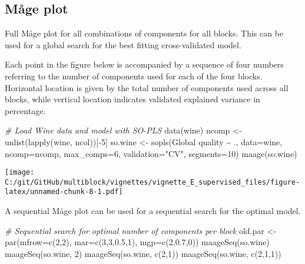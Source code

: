 \documentclass[
]{article}
\newenvironment{Shaded}{\begin{snugshade}}{\end{snugshade}}
\newcommand{\AttributeTok}[1]{\textcolor[rgb]{0.77,0.63,0.00}{#1}}
\newcommand{\CommentTok}[1]{\textcolor[rgb]{0.56,0.35,0.01}{\textit{#1}}}
\newcommand{\DecValTok}[1]{\textcolor[rgb]{0.00,0.00,0.81}{#1}}
\newcommand{\FloatTok}[1]{\textcolor[rgb]{0.00,0.00,0.81}{#1}}
\newcommand{\FunctionTok}[1]{\textcolor[rgb]{0.00,0.00,0.00}{#1}}
\newcommand{\NormalTok}[1]{#1}
\newcommand{\OtherTok}[1]{\textcolor[rgb]{0.56,0.35,0.01}{#1}}
\newcommand{\SpecialCharTok}[1]{\textcolor[rgb]{0.00,0.00,0.00}{#1}}
\newcommand{\StringTok}[1]{\textcolor[rgb]{0.31,0.60,0.02}{#1}}
\begin{document}
\hypertarget{muxe5ge-plot}{%
\subsection{Måge plot}\label{muxe5ge-plot}}

Full Måge plot for all combinations of components for all blocks. This
can be used for a global search for the best fitting cross-validated
model.

Each point in the figure below is accompanied by a sequence of four
numbers referring to the number of components used for each of the four
blocks. Horizontal location is given by the total number of components
used across all blocks, while vertical location indicates validated
explained variance in percentage.

\begin{Shaded}
\begin{Highlighting}[]
\CommentTok{\# Load Wine data and model with SO{-}PLS}
\FunctionTok{data}\NormalTok{(wine)}
\NormalTok{ncomp }\OtherTok{\textless{}{-}} \FunctionTok{unlist}\NormalTok{(}\FunctionTok{lapply}\NormalTok{(wine, ncol))[}\SpecialCharTok{{-}}\DecValTok{5}\NormalTok{]}
\NormalTok{so.wine }\OtherTok{\textless{}{-}} \FunctionTok{sopls}\NormalTok{(}\StringTok{\textasciigrave{}}\AttributeTok{Global quality}\StringTok{\textasciigrave{}} \SpecialCharTok{\textasciitilde{}}\NormalTok{ ., }\AttributeTok{data=}\NormalTok{wine, }\AttributeTok{ncomp=}\NormalTok{ncomp, }
             \AttributeTok{max\_comps=}\DecValTok{6}\NormalTok{, }\AttributeTok{validation=}\StringTok{"CV"}\NormalTok{, }\AttributeTok{segments=}\DecValTok{10}\NormalTok{)}
\FunctionTok{maage}\NormalTok{(so.wine)}
\end{Highlighting}
\end{Shaded}

\texttt{[image: C:/git/GitHub/multiblock/vignettes/vignette\_E\_supervised\_files/figure-latex/unnamed-chunk-8-1.pdf]}

A sequential Måge plot can be used for a sequential search for the
optimal model.

\begin{Shaded}
\begin{Highlighting}[]
\CommentTok{\# Sequential search for optimal number of components per block}
\NormalTok{old.par }\OtherTok{\textless{}{-}} \FunctionTok{par}\NormalTok{(}\AttributeTok{mfrow=}\FunctionTok{c}\NormalTok{(}\DecValTok{2}\NormalTok{,}\DecValTok{2}\NormalTok{), }\AttributeTok{mar=}\FunctionTok{c}\NormalTok{(}\DecValTok{3}\NormalTok{,}\DecValTok{3}\NormalTok{,}\FloatTok{0.5}\NormalTok{,}\DecValTok{1}\NormalTok{), }\AttributeTok{mgp=}\FunctionTok{c}\NormalTok{(}\DecValTok{2}\NormalTok{,}\FloatTok{0.7}\NormalTok{,}\DecValTok{0}\NormalTok{))}
\FunctionTok{maageSeq}\NormalTok{(so.wine)}
\FunctionTok{maageSeq}\NormalTok{(so.wine, }\DecValTok{2}\NormalTok{)}
\FunctionTok{maageSeq}\NormalTok{(so.wine, }\FunctionTok{c}\NormalTok{(}\DecValTok{2}\NormalTok{,}\DecValTok{1}\NormalTok{))}
\FunctionTok{maageSeq}\NormalTok{(so.wine, }\FunctionTok{c}\NormalTok{(}\DecValTok{2}\NormalTok{,}\DecValTok{1}\NormalTok{,}\DecValTok{1}\NormalTok{))}
\end{Highlighting}
\end{Shaded}
\end{document}
